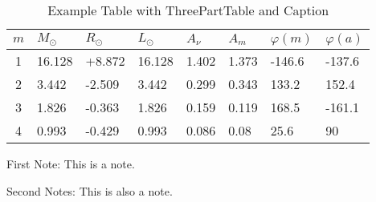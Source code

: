 \begin{table}[h!]
    \centering
    \begin{threeparttable}
        \caption{Example Table with ThreePartTable and Caption
        \label{tab: example-tabularx}}
        \begin{tabularx}{\textwidth}{cXXXXXXX}
            \toprule
            {$m$} & {$M_\odot$} & {$R_\odot$} & {$L_\odot$} & {$A_\nu$} & {$A_m$} & {$\varphi(m)$} & {$\varphi(a)$} \\ \midrule
            1  & 16.128 & +8.872 & 16.128 & 1.402 & 1.373 & -146.6 & -137.6 \\
            2  & 3.442  & -2.509 & 3.442  & 0.299 & 0.343 & 133.2  & 152.4  \\ \midrule
            3  & 1.826  & -0.363 & 1.826  & 0.159 & 0.119 & 168.5  & -161.1 \\
            4  & 0.993  & -0.429 & 0.993  & 0.086 & 0.08  & 25.6   & 90     \\ \bottomrule
        \end{tabularx}
        \begin{tablenotes}[flushleft]
            \footnotesize
            \item First Note: This is a note.
            \item Second Notes: This is also a note.
        \end{tablenotes}
    \end{threeparttable}
\end{table}